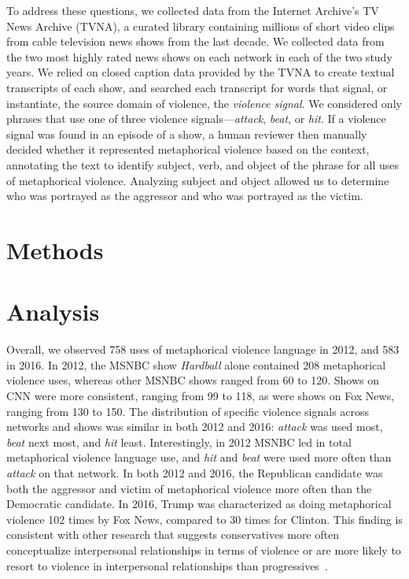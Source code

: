 To address these questions, we collected data
from the Internet Archive's TV News Archive (TVNA), a curated
library containing millions of short video clips from cable television news
shows from the last decade. We collected data from the two most highly rated
news shows on each network in each of the two study years. We relied on closed caption data provided by the TVNA
to create textual transcripts of each show, and searched each transcript for
words that signal, or instantiate, the source domain of violence, the
\emph{violence signal}. We considered only phrases that use one of three
violence signals---\emph{attack}, \emph{beat}, or \emph{hit}. If a violence
signal was found in an episode of a show, a human reviewer then manually decided
whether it represented metaphorical violence based on the context, annotating
the text to identify subject, verb, and object of the phrase for all uses of
metaphorical violence.  Analyzing subject and object allowed us to determine who
was portrayed as the aggressor and who was portrayed as the victim.

\section{Methods}


\section{Analysis}

Overall, we observed 758 uses of metaphorical violence language in 2012, and 583
in 2016. In 2012, the MSNBC show \emph{Hardball} alone contained 208
metaphorical violence uses, whereas other MSNBC shows ranged from 60 to 120.
Shows on CNN were more consistent, ranging from 99 to 118, as were shows on Fox
News, ranging from 130 to 150. The distribution of specific violence signals
across networks and shows was similar in both 2012 and 2016: \emph{attack} was
used most, \emph{beat} next most, and \emph{hit} least. Interestingly, in 2012
MSNBC led in total metaphorical violence language use, and \emph{hit} and
\emph{beat} were used more often than \emph{attack} on that network.
In both 2012 and 2016, the
Republican candidate was both the aggressor and victim of metaphorical violence
more often than the Democratic candidate. In 2016, Trump was characterized as
doing metaphorical violence 102 times by Fox News, compared to 30 times for
Clinton. This finding is consistent with other research that suggests
conservatives more often conceptualize interpersonal relationships in terms of
violence or are more likely to resort to violence in interpersonal relationships
than progressives~\cite{Lakoff1996, Cohen1996}. 

